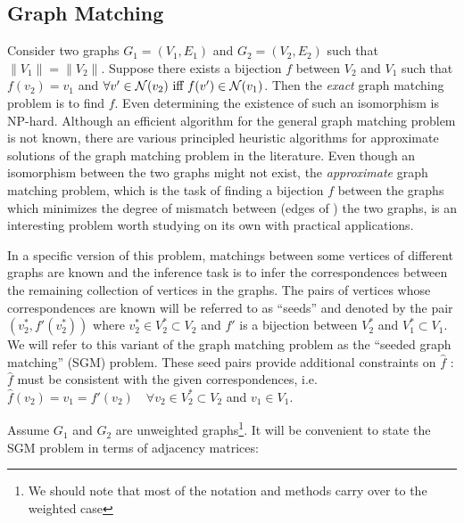 \documentclass[12pt,oneside,final]{thesis}\usepackage[]{graphicx}\usepackage[]{color}
\begin{document}
\subsection{Graph Matching}
Consider two  graphs $G_1=(V_1,E_1)$ and $G_2=(V_2,E_2)$   such that $\| V_1 \|=\| V_2 \|$. Suppose there exists a bijection $f$  between $V_2$ and $V_1$ such that $f(v_2)=v_1$ and $\forall v' \in \mathcal{N}(v_2) \textrm{ iff } f(v') \in \mathcal{N}(v_1)$. Then the \emph{exact} graph matching problem  is to find $f$. Even determining the existence  of such an isomorphism is NP-hard.  Although an efficient algorithm  for the general  graph matching problem is not known, there are various principled heuristic algorithms for  approximate solutions of the graph matching problem  in the literature\cite{GraphMatchReview}.
Even though an isomorphism between the two graphs might not exist,  the \emph{approximate} graph matching problem, which is the task of  finding a bijection $f$ between the
graphs which minimizes the degree  of mismatch   between  (edges of ) the two graphs, is an interesting problem  worth studying on its own with practical applications\cite{GraphMatchReview,Bengoetxea2002,recentdevGraphMatching2000,VogConGraphMatchFAQ,Zaslavskiy2009}.


In a specific version of this problem, matchings between some vertices of different graphs are known  and  the  inference task is to infer the correspondences between the remaining collection of vertices in the graphs.  The pairs of vertices whose correspondences are known will be referred to as ``seeds'' and denoted by the pair $(v_2^*,f'(v_2^*)) $  where $v_2^* \in V_2^{*} \subset V_2$ and $f'$ is a bijection between  $V_2^{*}$ and $V_1^{*}\subset V_1$. We will refer to this variant of the graph matching problem as the ``seeded graph matching'' (SGM) problem. These seed pairs provide additional constraints on $\hat{f}$ : $\hat{f}$ must be consistent with the given correspondences, i.e.  $\hat{f}(v_2)=v_1=f'(v_2)\quad \forall v_2 \in V_2^{*} \subset V_2$ and $v_1 \in V_1$. 

Assume $G_1$ and $G_2$ are unweighted graphs\footnote{We should note that most of the notation and methods carry over to the weighted case}. It will be convenient to state the SGM problem in terms of adjacency matrices:
\end{document}
